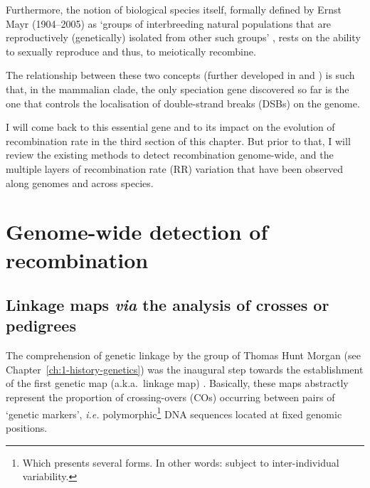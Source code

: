 Furthermore, the notion of biological species itself, formally defined by Ernst Mayr (1904--2005) as ‘groups of interbreeding natural populations that are reproductively (genetically) isolated from other such groups’ \citep{mayr1999systematics}, rests on the ability to sexually reproduce and thus, to meiotically recombine.

The relationship between these two concepts (further developed in \citealp{felsenstein1981skepticism} and \citealp{butlin2005recombination}) is such that, in the mammalian clade, the only speciation gene discovered so far is the one that controls the localisation of double-strand breaks (DSBs) on the genome.

I will come back to this essential gene and to its impact on the evolution of recombination rate in the third section of this chapter. 
But prior to that, I will review the existing methods to detect recombination genome-wide, and the multiple layers of recombination rate (RR) variation that have been observed along genomes and across species.



\section{Genome-wide detection of recombination}

\subsection{Linkage maps \textit{via} the analysis of crosses or pedigrees}
\label{chap3:linkage-maps}

The comprehension of genetic linkage by the group of Thomas Hunt Morgan (see Chapter~\ref{ch:1-history-genetics}) was the inaugural step towards the establishment of the first genetic map (a.k.a.\ linkage map) \citep{sturtevant1913linear}.
Basically, these maps abstractly represent the proportion of crossing-overs (COs) occurring between pairs of ‘genetic markers’, \textit{i.e.} polymorphic\footnote{Which presents several forms. In other words: subject to inter-individual variability.} DNA sequences located at fixed genomic positions.

